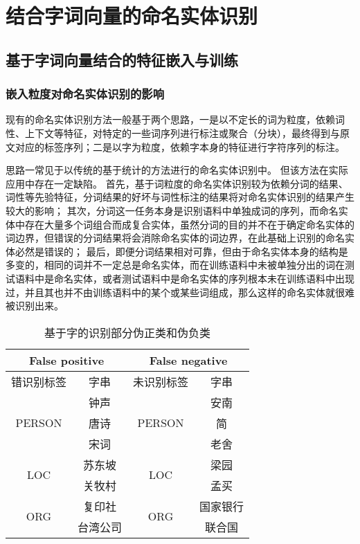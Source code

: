 \chapter{结合字词向量的命名实体识别}
\section{基于字词向量结合的特征嵌入与训练}
\subsection{嵌入粒度对命名实体识别的影响}
\label{subsec:analyze}
现有的命名实体识别方法一般基于两个思路，一是以不定长的词为粒度，依赖词性、上下文等特征，对特定的一些词序列进行标注或聚合（分块），最终得到与原文对应的标签序列；二是以字为粒度，依赖字本身的特征进行字符序列的标注。

思路一常见于以传统的基于统计的方法进行的命名实体识别中。
但该方法在实际应用中存在一定缺陷。
首先，基于词粒度的命名实体识别较为依赖分词的结果、词性等先验特征，分词结果的好坏与词性标注的结果将对命名实体识别的结果产生较大的影响；
其次，分词这一任务本身是识别语料中单独成词的序列，而命名实体中存在大量多个词组合而成复合实体，虽然分词的目的并不在于确定命名实体的词边界，但错误的分词结果将会消除命名实体的词边界，在此基础上识别的命名实体必然是错误的；
最后，即便分词结果相对可靠，但由于命名实体本身的结构是多变的，相同的词并不一定总是命名实体，而在训练语料中未被单独分出的词在测试语料中是命名实体，或者测试语料中是命名实体的序列根本未在训练语料中出现过，并且其也并不由训练语料中的某个或某些词组成，那么这样的命名实体就很难被识别出来。

\begin{table}[H]
    \centering
    \caption{基于字的识别部分伪正类和伪负类}
    \begin{tabular}{cccc}
        \toprule
        \multicolumn{2}{c}{False positive} & \multicolumn{2}{c}{False negative}\\
        \midrule
        错识别标签 & 字串 & 未识别标签 & 字串\\
        \cmidrule(lr){1-2}\cmidrule(lr){3-4}
        \multirow{3}{*}{PERSON} & 钟声 & \multirow{3}{*}{PERSON} & 安南 \\
        & 唐诗 & & 简 \\
        & 宋词 & & 老舍\\
        \cmidrule(lr){1-2}\cmidrule(lr){3-4}
        \multirow{2}{*}{LOC} & 苏东坡 & \multirow{2}{*}{LOC}& 梁园\\
        & 关牧村 & & 孟买 \\
        \cmidrule(lr){1-2}\cmidrule(lr){3-4}
        \multirow{2}{*}{ORG} & 复印社 & \multirow{2}{*}{ORG}& 国家银行\\
        & 台湾公司 & & 联合国\\
        \bottomrule
    \end{tabular}
    \label{tab:fp_fn_word}
\end{table}

